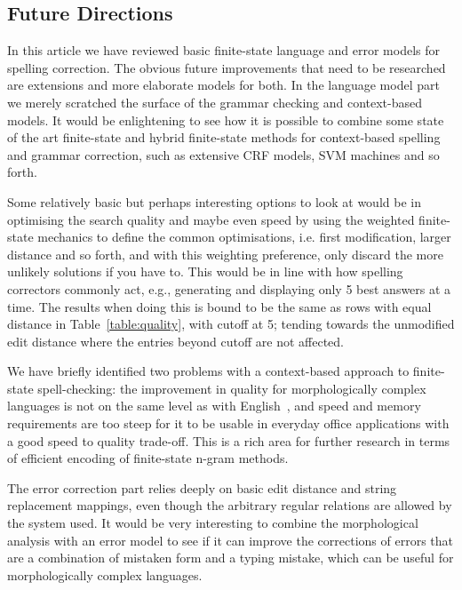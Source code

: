 \documentclass[a4paper,12pt]{article}
\begin{document}
\subsection{Future Directions}
\label{subsec:future}

In this article we have reviewed basic finite-state language and error models
for spelling correction. The obvious future improvements that need to be
researched are extensions and more elaborate models for both. In the language
model part we merely scratched the surface of the grammar checking and
context-based models. It would be enlightening to see how it is possible to
combine some state of the art finite-state and hybrid finite-state methods for
context-based spelling and grammar correction, such as extensive CRF models,
SVM machines and so forth.

Some relatively basic but perhaps interesting options to look at would be in
optimising the search quality and maybe even speed by using the weighted
finite-state mechanics to define the common optimisations, i.e. first
modification, larger distance and so forth, and with this weighting preference,
only discard the more unlikely solutions if you have to. This would be in line
with how spelling correctors commonly act, e.g., generating and displaying only
5 best answers at a time. The results when doing this is bound to be the same
as rows with equal distance in Table~\ref{table:quality}, with cutoff at 5;
tending towards the unmodified edit distance where the entries beyond cutoff
are not affected.

We have briefly identified two problems with a context-based approach to
finite-state spell-checking: the improvement in quality for morphologically
complex languages is not on the same level as with
English~\cite[]{wilcoxohearn2008realword}, and speed and memory requirements
are too steep for it to be usable in everyday office applications with a good
speed to quality trade-off. This is a rich area for further research in terms
of efficient encoding of finite-state n-gram methods.

The error correction part relies deeply on basic edit distance and string
replacement mappings, even though the arbitrary regular relations are allowed
by the system used. It would be very interesting to combine the morphological
analysis with an error model to see if it can improve the corrections of errors
that are a combination of mistaken form and a typing mistake, which can be
useful for morphologically complex languages.
\end{document}
